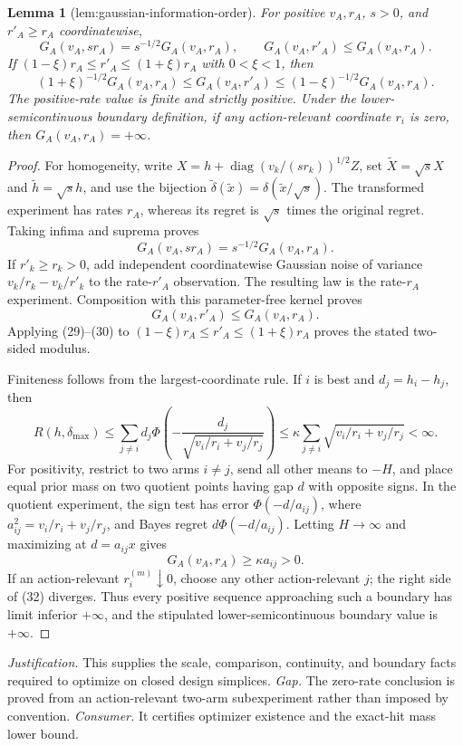 \documentclass{article}
\newtheorem{lemma}{Lemma}
\begin{document}
\begin{lemma}[lem:gaussian-information-order]\label{lem:gaussian-information-order}
For positive \(v_A,r_A\), \(s>0\), and \(r'_A\geq r_A\) coordinatewise,
\[
G_A(v_A,sr_A)=s^{-1/2}G_A(v_A,r_A),\qquad G_A(v_A,r'_A)\leq G_A(v_A,r_A).
\]
If \((1-\xi)r_A\leq r'_A\leq(1+\xi)r_A\) with \(0<\xi<1\), then
\[
(1+\xi)^{-1/2}G_A(v_A,r_A)\leq G_A(v_A,r'_A)\leq(1-\xi)^{-1/2}G_A(v_A,r_A).
\]
The positive-rate value is finite and strictly positive.  Under the lower-semicontinuous boundary definition, if any action-relevant coordinate \(r_i\) is zero, then \(G_A(v_A,r_A)=+\infty\).
\end{lemma}
\begin{proof}
For homogeneity, write \(X=h+\operatorname{diag}(v_k/(sr_k))^{1/2}Z\), set \(\widetilde X=\sqrt sX\) and \(\widetilde h=\sqrt sh\), and use the bijection \(\widetilde\delta(\widetilde x)=\delta(\widetilde x/\sqrt s)\).  The transformed experiment has rates \(r_A\), whereas its regret is \(\sqrt s\) times the original regret.  Taking infima and suprema proves
\[
 G_A(v_A,sr_A)=s^{-1/2}G_A(v_A,r_A). \tag{29}
\]
If \(r'_k\geq r_k>0\), add independent coordinatewise Gaussian noise of variance \(v_k/r_k-v_k/r'_k\) to the rate-\(r'_A\) observation.  The resulting law is the rate-\(r_A\) experiment.  Composition with this parameter-free kernel proves
\[
G_A(v_A,r'_A)\leq G_A(v_A,r_A). \tag{30}
\]
Applying (29)--(30) to \((1-\xi)r_A\leq r'_A\leq(1+\xi)r_A\) proves the stated two-sided modulus.

Finiteness follows from the largest-coordinate rule.  If \(i\) is best and \(d_j=h_i-h_j\), then
\[
R(h,\delta_{\max})\leq\sum_{j\ne i}d_j
 \Phi\!\left(-\frac{d_j}{\sqrt{v_i/r_i+v_j/r_j}}\right)
\leq\kappa\sum_{j\ne i}\sqrt{v_i/r_i+v_j/r_j}<\infty. \tag{31}
\]
For positivity, restrict to two arms \(i\ne j\), send all other means to \(-H\), and place equal prior mass on two quotient points having gap \(d\) with opposite signs.  In the quotient experiment, the sign test has error \(\Phi(-d/a_{ij})\), where \(a_{ij}^2=v_i/r_i+v_j/r_j\), and Bayes regret \(d\Phi(-d/a_{ij})\).  Letting \(H\to\infty\) and maximizing at \(d=a_{ij}x\) gives
\[
G_A(v_A,r_A)\geq\kappa a_{ij}>0. \tag{32}
\]
If an action-relevant \(r_i^{(m)}\downarrow0\), choose any other action-relevant \(j\); the right side of (32) diverges.  Thus every positive sequence approaching such a boundary has limit inferior \(+\infty\), and the stipulated lower-semicontinuous boundary value is \(+\infty\).
\end{proof}
\par\smallskip\noindent \textit{Justification.} This supplies the scale, comparison, continuity, and boundary facts required to optimize on closed design simplices. \textit{Gap.} The zero-rate conclusion is proved from an action-relevant two-arm subexperiment rather than imposed by convention. \textit{Consumer.} It certifies optimizer existence and the exact-hit mass lower bound.
\end{document}
